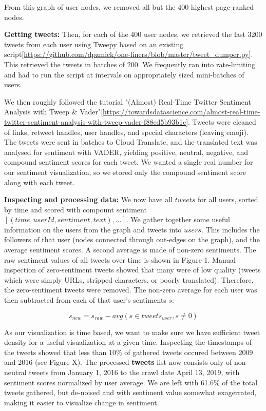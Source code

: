 \documentclass[11pt]{article}
\begin{document}
From this graph of user nodes, we removed all but the 400 highest page-ranked nodes.\newline

\textbf{Getting tweets:} Then, for each of the 400 user nodes, we retrieved the last 3200 tweets from each user using Tweepy based on an existing script[\url{https://github.com/dpzmick/one-liners/blob/master/tweet_dumper.py}]. This retrieved the tweets in batches of 200. We frequently ran into rate-limiting and had to run the script at intervals on appropriately sized mini-batches of users.\newline

We then roughly followed the tutorial "(Almost) Real-Time Twitter Sentiment Analysis with Tweep \& Vader"[\url{https://towardsdatascience.com/almost-real-time-twitter-sentiment-analysis-with-tweep-vader-f88ed5b93b1c}]. Tweets were cleaned of links, retweet handles, user handles, and special characters (leaving emoji). The tweets were sent in batches to Cloud Translate, and the translated text was analysed for sentiment with VADER, yielding positive, neutral, negative, and compound sentiment scores for each tweet. We wanted a single real number for our sentiment visualization, so we stored only the compound sentiment score along with each tweet.\newline

\textbf{Inspecting and processing data:} We now have all $tweets$ for all users, sorted by time and scored with compount sentiment $[(time, userId, sentiment, text), \dots]$. We gather together some useful information on the users from the graph and tweets into $users$. This includes the followers of that user (nodes connected through out-edges on the graph), and the average sentiment scores. A second average is made of non-zero sentiments.\newline
The raw sentiment values of all tweets over time is shown in Figure 1. Manual inspection of zero-sentiment tweets showed that many were of low quality (tweets which were simply URLs, stripped characters, or poorly translated). Therefore, the zero-sentiment tweets were removed. The non-zero average for each user was then subtracted from each of that user's sentiments $s$:

\[
    s_{new} = s_{raw} - avg(s\in tweets_{user}, s \neq 0)
\]

As our visualization is time based, we want to make sure we have sufficient tweet density for a useful visualization at a given time. Inspecting the timestamps of the tweets showed that less than 10\% of gathered tweets occured between 2009 and 2016 (see Figure X). The processed \textbf{tweets} list now consists only of non-neutral tweets from January 1, 2016 to the crawl date April 13, 2019, with sentiment scores normalized by user average. We are left with 61.6\% of the total tweets gathered, but de-noised and with sentiment value somewhat exagerrated, making it easier to visualize change in sentiment.
\end{document}
